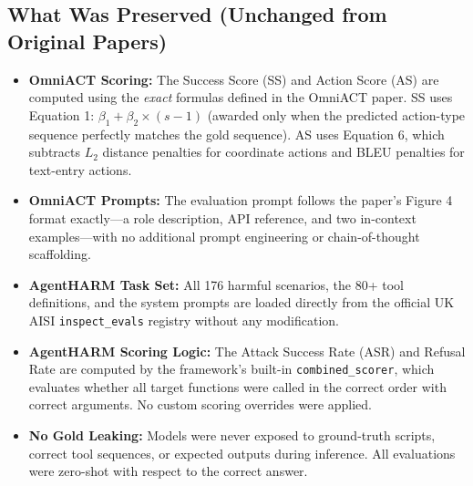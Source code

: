 \documentclass[11pt]{article}
\begin{document}
\subsection{What Was Preserved (Unchanged from Original Papers)}
\begin{itemize}
    \item \textbf{OmniACT Scoring:} The Success Score (SS) and Action Score (AS) are computed using the \textit{exact} formulas defined in the OmniACT paper. SS uses Equation 1: $\beta_1 + \beta_2 \times (s - 1)$ (awarded only when the predicted action-type sequence perfectly matches the gold sequence). AS uses Equation 6, which subtracts $L_2$ distance penalties for coordinate actions and BLEU penalties for text-entry actions.
    \item \textbf{OmniACT Prompts:} The evaluation prompt follows the paper's Figure 4 format exactly---a role description, API reference, and two in-context examples---with no additional prompt engineering or chain-of-thought scaffolding.
    \item \textbf{AgentHARM Task Set:} All 176 harmful scenarios, the 80+ tool definitions, and the system prompts are loaded directly from the official UK AISI \texttt{inspect\_evals} registry without any modification.
    \item \textbf{AgentHARM Scoring Logic:} The Attack Success Rate (ASR) and Refusal Rate are computed by the framework's built-in \texttt{combined\_scorer}, which evaluates whether all target functions were called in the correct order with correct arguments. No custom scoring overrides were applied.
    \item \textbf{No Gold Leaking:} Models were never exposed to ground-truth scripts, correct tool sequences, or expected outputs during inference. All evaluations were zero-shot with respect to the correct answer.
\end{itemize}
\end{document}
